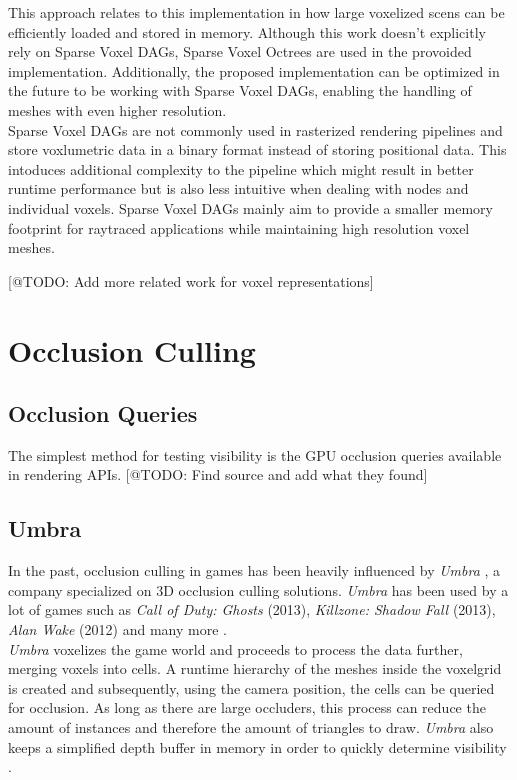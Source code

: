 \noindent
This approach relates to this implementation in how large voxelized scens can be efficiently loaded and stored in 
memory. Although this work doesn't explicitly rely on Sparse Voxel \ac{DAG}s, Sparse Voxel Octrees are used in the 
provoided implementation. Additionally, the proposed implementation can be optimized in the future to be working 
with Sparse Voxel \ac{DAG}s, enabling the handling of meshes with even higher resolution. \\

\noindent
Sparse Voxel \ac{DAG}s are not commonly used in rasterized rendering pipelines and store voxlumetric data in a binary 
format instead of storing positional data. This intoduces additional complexity to the pipeline which might result in 
better runtime performance but is also less intuitive when dealing with nodes and individual voxels. Sparse Voxel 
\ac{DAG}s mainly aim to provide a smaller memory footprint for raytraced applications while maintaining high resolution 
voxel meshes.


[@TODO: Add more related work for voxel representations]

\section*{Occlusion Culling}


\subsection*{Occlusion Queries}

The simplest method for testing visibility is the \ac{GPU} occlusion queries available in rendering \ac{API}s.
[@TODO: Find source and add what they found]

\subsection*{Umbra}

In the past, occlusion culling in games has been heavily influenced by \emph{Umbra} \cite{Umbra2024}, a company 
specialized on 3D occlusion culling solutions. \emph{Umbra} has been used by a lot of games such as 
\emph{Call of Duty: Ghosts} (2013), \emph{Killzone: Shadow Fall} (2013), \emph{Alan Wake} (2012) and many more 
\cite{UmbraWiki,CallOfDutyGhostsCredits,KillzoneUmbra,AlanWakeUmbra}. \\

\noindent
\emph{Umbra} voxelizes the game world and proceeds to process the data further, merging voxels into cells. 
A runtime hierarchy of the meshes inside the voxelgrid is created and subsequently, using the camera position, 
the cells can be queried for occlusion. As long as there are large occluders, this process can reduce the amount 
of instances and therefore the amount of triangles to draw. \emph{Umbra} also keeps a simplified depth buffer in 
memory in order to quickly determine visibility \cite{Medium2018}. \\

